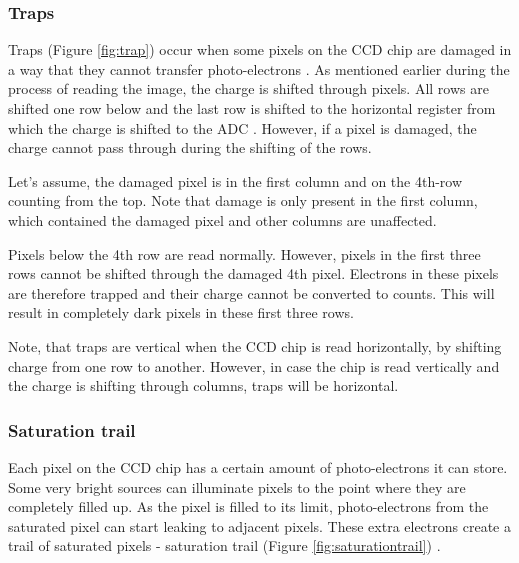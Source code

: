     
    
    \subsubsection{Traps} 
    
    Traps (Figure \ref{fig:trap}) occur when some pixels on the CCD chip are damaged in a way that they cannot transfer photo-electrons \cite{articleCCDartifacts}. 
    As mentioned earlier during the process of reading the image, the charge is shifted through pixels. All rows are shifted one row below and the last row is shifted to the horizontal register from which the charge is shifted to the ADC \cite{articleCcdOnline}. However, if a pixel is damaged, the charge cannot pass through during the shifting of the rows. 
    
    Let's assume, the damaged pixel is in the first column and on the 4th-row counting from the top. Note that damage is only present in the first column, which contained the damaged pixel and other columns are unaffected.
    
    Pixels below the 4th row are read normally. However, pixels in the first three rows cannot be shifted through the damaged 4th pixel. Electrons in these pixels are therefore trapped and their charge cannot be converted to counts. This will result in completely dark pixels in these first three rows. %
    
    Note, that traps are vertical when the CCD chip is read horizontally, by shifting charge from one row to another. However, in case the chip is read vertically and the charge is shifting through columns, traps will be horizontal. 


    \subsubsection{Saturation trail}
    
    Each pixel on the CCD chip has a certain amount of photo-electrons it can store. Some very bright sources can illuminate pixels to the point where they are completely filled up. As the pixel is filled to its limit, photo-electrons from the saturated pixel can start leaking to adjacent pixels. These extra electrons create a trail of saturated pixels - saturation trail (Figure \ref{fig:saturationtrail}) \cite{articleCCDartifacts}.
    
